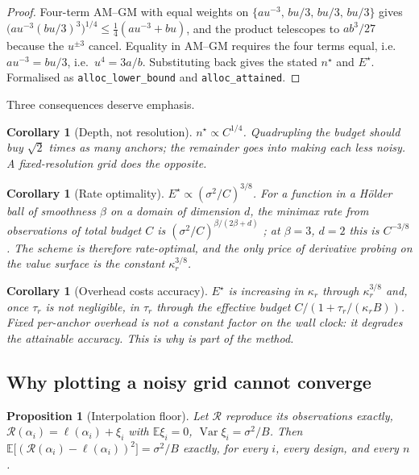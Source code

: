 \documentclass[11pt]{article}
\newtheorem{proposition}[theorem]{Proposition}
\newtheorem{corollary}[theorem]{Corollary}
\theoremstyle{definition}
\newcommand{\E}{\mathbb{E}}
\newcommand{\Var}{\operatorname{Var}}
\newcommand{\Rec}{\mathcal{R}}
\newcommand{\lean}[1]{\texttt{#1}}
\begin{document}
\begin{proof}
Four-term AM--GM with equal weights on
$\{au^{-3},\,bu/3,\,bu/3,\,bu/3\}$ gives
$\bigl(au^{-3}(bu/3)^3\bigr)^{1/4}\le\tfrac14(au^{-3}+bu)$, and the product telescopes
to $ab^3/27$ because the $u^{\pm3}$ cancel. Equality in AM--GM requires the four terms
equal, i.e.\ $au^{-3}=bu/3$, i.e.\ $u^4=3a/b$. Substituting back gives the stated
$n^\star$ and $E^\star$. Formalised as \lean{alloc\_lower\_bound} and
\lean{alloc\_attained}.
\end{proof}

Three consequences deserve emphasis.

\begin{corollary}[Depth, not resolution]
$n^\star\propto C^{1/4}$. Quadrupling the budget should buy $\sqrt2$ times as many
anchors; the remainder goes into making each less noisy. A fixed-resolution grid does
the opposite.
\end{corollary}

\begin{corollary}[Rate optimality]
$E^\star\propto(\sigma^2/C)^{3/8}$. For a function in a H\"older ball of smoothness
$\beta$ on a domain of dimension $d$, the minimax rate from observations of total
budget $C$ is $(\sigma^2/C)^{\beta/(2\beta+d)}$
\citep{stone1980optimal,tsybakov2009introduction}; at $\beta=3$, $d=2$ this is
$C^{-3/8}$. The scheme is therefore rate-optimal, and the only price of derivative
probing on the value surface is the constant $\kappa_r^{3/8}$.
\end{corollary}

\begin{corollary}[Overhead costs accuracy]
\label{cor:tau}
$E^\star$ is increasing in $\kappa_r$ through $\kappa_r^{3/8}$ and, once $\tau_r$ is not
negligible, in $\tau_r$ through the effective budget $C/(1+\tau_r/(\kappa_rB))$. Fixed
per-anchor overhead is not a constant factor on the wall clock: it degrades the
attainable accuracy. This is why  is part of the method.
\end{corollary}

\subsection{Why plotting a noisy grid cannot converge}

\begin{proposition}[Interpolation floor]
\label{prop:floor}
Let $\Rec$ reproduce its observations exactly, $\Rec(\alpha_i)=\ell(\alpha_i)+\xi_i$
with $\E\xi_i=0$, $\Var\xi_i=\sigma^2/B$. Then
$\E\bigl[(\Rec(\alpha_i)-\ell(\alpha_i))^2\bigr]=\sigma^2/B$ exactly, for every $i$,
every design, and every $n$.
\end{proposition}
\end{document}
